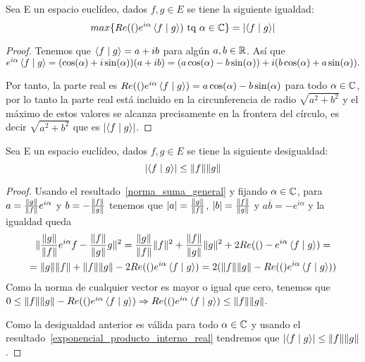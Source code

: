 \begin{resultado}
  \label{exponencial_producto_interno_real}
  Sea E un espacio euclídeo, dados $f,g\in E$ se tiene la siguiente igualdad:
  \begin{equation}
    max\{Re(()e^{i\alpha}\left\langle f\mid g\right\rangle)\text{ tq }\alpha\in\mathbb{C}\}=\lvert\left\langle f\mid g\right\rangle\rvert
  \end{equation}
\end{resultado}
\begin{proof}
  Tenemos que $\left\langle f\mid g\right\rangle=a+ib$ para algún $a,b\in\mathbb{R}$. Así que $e^{i\alpha}\left\langle f\mid g\right\rangle=(\cos(\alpha)+i \sin(\alpha))(a+ib)=(a \cos(\alpha)-b \sin(\alpha)) + i(b \cos(\alpha)+a\sin(\alpha)).$

  Por tanto, la parte real es $Re(()e^{i\alpha}\left\langle f\mid g\right\rangle)=a \cos(\alpha)-b \sin(\alpha)$ para todo $\alpha\in\mathbb{C}$, por lo tanto la parte real está incluido en la circunferencia de radio $\sqrt{a^2+b^2}$ y el máximo de estos valores se alcanza precisamente en la frontera del círculo, es decir $\sqrt{a^2+b^2}$ que es $\lvert\left\langle f\mid g\right\rangle\rvert$.
\end{proof}
\begin{resultado}
  \label{norma_producto_escalar_producto_norma}
  Sea E un espacio euclídeo, dados $f,g\in E$ se tiene la siguiente desigualdad:
  \begin{equation}
    \lvert\left\langle f\mid g\right\rangle\rvert\leq\lVert f\rVert\lVert g\rVert
  \end{equation}
\end{resultado}

\begin{proof}
  Usando el resultado~\eqref{norma_suma_general} y fijando $\alpha\in\mathbb{C}$, para $a=\frac{\lVert g\rVert}{\lVert f\rVert}e^{i\alpha}$ y $b=-\frac{\lVert f\rVert}{\lVert g\rVert}$ tenemos que $\lvert a\rvert=\frac{\lVert g\rVert}{\lVert f\rVert}$, $\lvert b\rvert=\frac{\lVert f\rVert}{\lVert g\rVert}$ y $a\overline{b}=-e^{i\alpha}$ y la igualdad queda
  \begin{multline*}
    \lVert\frac{\lVert g\rVert}{\lVert f\rVert}e^{i\alpha}f-\frac{\lVert f\rVert}{\lVert g\rVert}g\rVert^2=\frac{\lVert g\rVert}{\lVert f\rVert}\lVert f\rVert^2+\frac{\lVert f\rVert}{\lVert g\rVert}\lVert g\rVert^2+2Re(()-e^{i\alpha}\left\langle f\mid g\right\rangle)=\\
    =\lVert g\rVert\lVert f\rVert+\lVert f\rVert\lVert g\rVert-2Re(()e^{i\alpha}\left\langle f\mid g\right\rangle)=2(\lVert f\rVert\lVert g\rVert-Re(()e^{i\alpha}\left\langle f\mid g\right\rangle))
  \end{multline*}
  Como la norma de cualquier vector es mayor o igual que cero, tenemos que
  $0\leq\lVert f\rVert\lVert g\rVert-Re(()e^{i\alpha}\left\langle f\mid g\right\rangle)\Rightarrow Re(()e^{i\alpha}\left\langle f\mid g\right\rangle)\leq\lVert f\rVert\lVert g\rVert$.

  Como la desigualdad anterior es válida para todo $\alpha\in\mathbb{C}$ y usando el resultado~\eqref{exponencial_producto_interno_real} tendremos que $ \lvert\left\langle f\mid g\right\rangle\rvert\leq\lVert f\rVert\lVert g\rVert$.
\end{proof}

